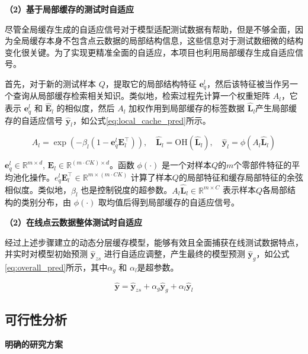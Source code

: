 \documentclass[12pt]{article}
\newcommand{\myEmph}[1]{\textbf{\textcolor[rgb]{0,0,0.25}{#1}}}
\begin{document}
\myEmph{（2）基于局部缓存的测试时自适应}

尽管全局缓存生成的自适应信号对于模型适配测试数据有帮助，但是不够全面，因为全局缓存本身不包含点云数据的局部结构信息，这些信息对于测试数细微的结构变化很关键。为了实现更精准全面的自适应，本项目也利用局部缓存生成自适应信号。

首先，对于新的测试样本 $Q$，提取它的局部结构特征 $\textbf{e}_q^{l}$，然后该特征被当作另一个查询从局部缓存检索相关知识。类似地，检索过程先计算一个权重矩阵 $A_{l}$，它表示 $\textbf{e}_q^{l}$ 和 $\hat{\textbf{E}}_{l}$ 的相似度，然后 $A_{l}$ 加权作用到局部缓存的标签数据 $\hat{\textbf{L}}_{l}$产生局部缓存的自适应信号 $\hat{\textbf{y}}_{l}$，如公式\ref{eq:local_cache_pred}所示。

\begin{equation}
    A_l = \exp(-\beta_l(1 - \textbf{e}_q^{l} \textbf{E}_{l}^\top)),\quad \hat{\textbf{L}}_{l} = \textrm{OH}(\hat{\textbf{L}}_{l}),\quad \hat{\textbf{y}}_{l} = \phi(A_{l} \hat{\textbf{L}}_{l})
    \label{eq:local_cache_pred}
\end{equation}

$\textbf{e}_q^{l} \in \mathbb{R}^{m\times d}$, $\textbf{E}_{l} \in \mathbb{R}^{(m\cdot CK)\times d}$。函数 $\phi(\cdot)$ 是一个对样本$Q$的$m$个零部件特征的平均池化操作。$e_q^{l} \textbf{E}_{l}^\top \in \mathbb{R}^{m\times (m\cdot CK)}$ 计算了样本$Q$的局部特征和缓存局部特征的余弦相似度。类似地，$\beta_l$ 也是控制锐度的超参数。$A_{l} \hat{\textbf{L}}_{l} \in \mathbb{R}^{m\times C}$ 表示样本$Q$各局部结构的类别分布，由 $\phi(\cdot)$ 取均值后得到局部缓存的自适应信号。

\myEmph{（2）在线点云数据整体测试时自适应}

经过上述步骤建立的动态分层缓存模型，能够有效且全面捕获在线测试数据特点，并实时对模型初始预测 $\hat{\textbf{y}}_{zs}$ 进行自适应调整，产生最终的模型预测 $\hat{\textbf{y}}_g$，如公式\ref{eq:overall_pred}所示，其中$\alpha_{g}$ 和 $\alpha_{l}$是超参数。

\begin{equation}
    \hat{\textbf{y}} = \hat{\textbf{y}}_{zs} + \alpha_g \hat{\textbf{y}}_{g} + \alpha_l \hat{\textbf{y}}_{l}
    \label{eq:overall_pred}
\end{equation}

\subsection{可行性分析}

\myEmph{明确的研究方案}
\end{document}
